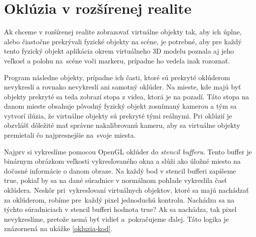 \section{Oklúzia v rozšírenej realite}

Ak chceme v rozšírenej realite zobrazovať virtuálne objekty tak, aby ich úplne, alebo čiastočne prekrývali fyzické objekty na scéne, je potrebné, aby pre každý tento fyzický objekt aplikácia okrem virtuálneho 3D modelu poznala aj jeho veľkosť a polohu na~scéne voči markeru, prípadne ho vedela inak rozoznať.

Program následne objekty, prípadne ich časti, ktoré sú prekryté oklúderom ne\-vy\-kres\-lí a rovnako ne\-vy\-kres\-lí ani samotný oklúder. Na mieste, kde majú byť objekty prekryté sa teda zobrazí stopa z videa, ktorá je na pozadí. Táto stopa na danom mieste obsahuje pôvodný fyzický objekt zosnímaný kamerou a tým sa vytvorí ilúzia, že virtuálne objekty sú prekryté tými reálnymi. Pri oklúzií je obzvlášť dôležité mať správne nakalibrovanú kameru, aby sa virtuálne objekty premietali čo najpresnejšie na~svoje miesta.

Najprv si vykreslíme pomocou OpenGL oklúder do \emph{stencil bufferu}. Tento buffer je binárnym obrázkom veľkosti vykresľovaného okna a slúži ako úložné miesto na dočasné informácie o danom obraze. Na každý bod v stencil bufferi zapíšeme true, pokiaľ by sa na dané súradnice v normálnom pohľade vykreslila časť oklúdera. Neskôr pri~vykresľovaní virtuálnych objektov, ktoré sa majú nachádzať za oklúderom, robíme pre~každý pixel jednoduchú kontrolu. Nachádza sa na týchto súradniciach v stencil bufferi hodnota true? Ak sa nachádza, tak pixel nevykreslíme, pretože nemá byť vidieť a~pokračujeme ďalej. Táto logika je znázornená na ukážke \ref{okluzia-kod}.


